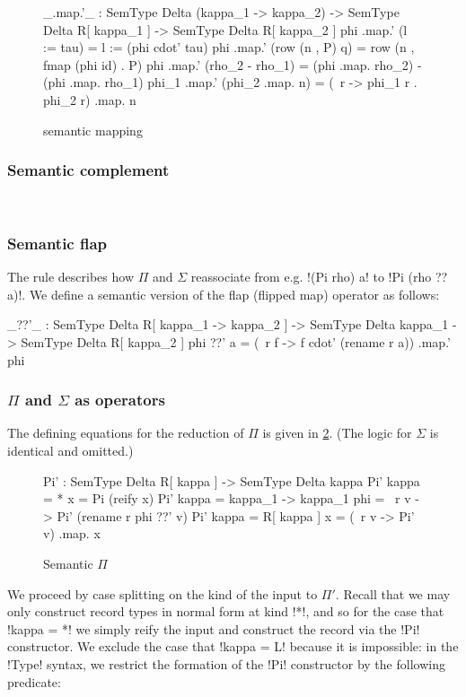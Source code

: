 \documentclass[sigplan,10pt,review]{acmart}\settopmatter{printfolios=true,printccs=false,printacmref=false}
\begin{document}
\begin{figure}
\begin{agda}
_.map.'_ : SemType Delta (kappa_1 -> kappa_2) -> 
           SemType Delta R[ kappa_1 ] -> 
           SemType Delta R[ kappa_2 ]
phi .map.' (l := tau) = l := (phi cdot' tau)
phi .map.' (row (n , P) q) = row (n , fmap (phi id) . P)
phi .map.' (rho_2 - rho_1) = (phi .map. rho_2) - (phi .map. rho_1)
phi_1 .map.' (phi_2 .map. n) = (\ r -> phi_1 r . phi_2 r) .map. n
\end{agda}
\caption{semantic mapping}
\label{fig:semantic-mapping}
\end{figure}

\subsubsection{Semantic complement}~

\subsubsection{Semantic flap}
The rule  describes how $\Pi$ and $\Sigma$ reassociate from e.g. !(Pi rho) a! to !Pi (rho ?? a)!. We define a semantic version of the flap (flipped map) operator as follows:

\begin{agda}
_??'_ : SemType Delta R[ kappa_1 -> kappa_2 ] -> 
       SemType Delta kappa_1 -> SemType Delta R[ kappa_2 ]
phi ??' a = (\ r f -> f cdot' (rename r a)) .map.' phi
\end{agda}

\subsubsection{$\Pi$ and $\Sigma$ as operators} The defining equations for the reduction of $\Pi$ is given in \cref{fig:semantic-pi}. (The logic for $\Sigma$ is identical and omitted.)

\begin{figure}
\begin{agda}
Pi' : SemType Delta R[ kappa ] -> SemType Delta kappa
Pi' {kappa = *} x = Pi (reify x)
Pi' {kappa = kappa_1 -> kappa_1} phi = \ r v -> Pi' (rename r phi ??' v)
Pi' {kappa = R[ kappa ]} x = (\ r v -> Pi' v) .map. x
\end{agda}
\caption{Semantic $\Pi$}
\label{fig:semantic-pi}
\end{figure}

We proceed by case splitting on the kind of the input to $\Pi'$. Recall that we may only construct record types in normal form at kind !*!, and so for the case that !kappa = *! we simply reify the input and construct the record via the !Pi! constructor. We exclude the case that !kappa = L! because it is impossible: in the !Type! syntax, we restrict the formation of the !Pi! constructor by the following predicate:
\end{document}
